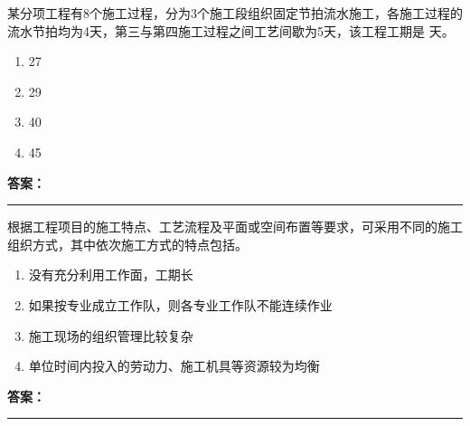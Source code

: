 \documentclass[UTF8,fontset=fandol,11pt]{ctexart}
\newcommand{\answerline}{\textcolor{answerred}{\rule{2.4cm}{0.7pt}}}
\begin{document}
\begin{quizbox}[title={乱序第 239 题｜第十章流水施工原理}]

某分项工程有8个施工过程，分为3个施工段组织固定节拍流水施工，各施工过程的流水节拍均为4天，第三与第四施工过程之间工艺间歇为5天，该工程工期是 天。\\

\begin{enumerate}[label=\Alph*.]

\item 27

\item 29

\item 40

\item 45

\end{enumerate}

\textbf{\textcolor{answerred}{答案：}} \answerline

\end{quizbox}

\vspace{0.2em}

\begin{quizbox}[title={乱序第 240 题｜第十章流水施工原理}]

根据工程项目的施工特点、工艺流程及平面或空间布置等要求，可采用不同的施工组织方式，其中依次施工方式的特点包括。\\

\begin{enumerate}[label=\Alph*.]

\item 没有充分利用工作面，工期长

\item 如果按专业成立工作队，则各专业工作队不能连续作业

\item 施工现场的组织管理比较复杂

\item 单位时间内投入的劳动力、施工机具等资源较为均衡

\end{enumerate}

\textbf{\textcolor{answerred}{答案：}} \answerline

\end{quizbox}

\vspace{0.2em}
\end{document}
